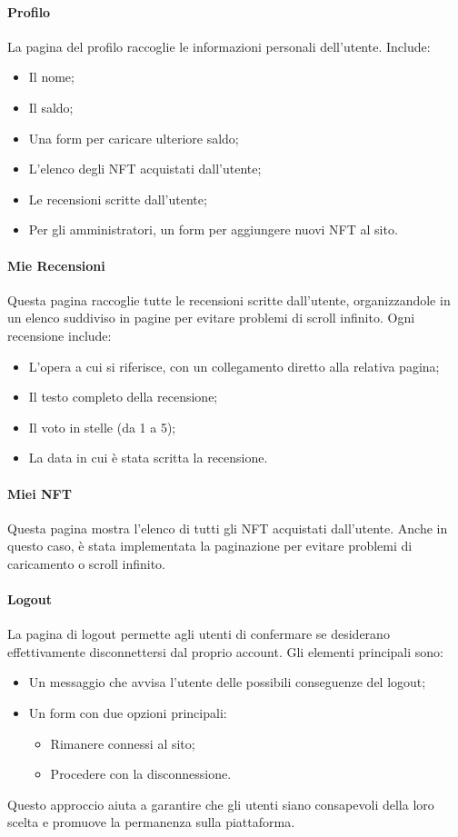 \documentclass[10pt]{article}
\begin{document}
\paragraph{Profilo} La pagina del profilo raccoglie le informazioni personali dell’utente. Include:
\begin{itemize}
    \item Il nome;
    \item Il saldo;
    \item Una form per caricare ulteriore saldo;
    \item L’elenco degli NFT acquistati dall’utente;
    \item Le recensioni scritte dall’utente;
    \item Per gli amministratori, un form per aggiungere nuovi NFT al sito.
\end{itemize}

\paragraph{Mie Recensioni}
Questa pagina raccoglie tutte le recensioni scritte dall’utente, organizzandole in un elenco suddiviso in pagine per evitare problemi di scroll infinito. Ogni recensione include:
\begin{itemize}
    \item L’opera a cui si riferisce, con un collegamento diretto alla relativa pagina;
    \item Il testo completo della recensione;
    \item Il voto in stelle (da 1 a 5);
    \item La data in cui è stata scritta la recensione.
\end{itemize} 

\paragraph{Miei NFT}
Questa pagina mostra l’elenco di tutti gli NFT acquistati dall’utente. Anche in questo caso, è stata implementata la paginazione per evitare problemi di caricamento o scroll infinito.

\paragraph{Logout} La pagina di logout permette agli utenti di confermare se desiderano effettivamente disconnettersi dal proprio account. Gli elementi principali sono:
\begin{itemize}
\item Un messaggio che avvisa l’utente delle possibili conseguenze del logout;
\item Un form con due opzioni principali:
\begin{itemize}
\item Rimanere connessi al sito;
\item Procedere con la disconnessione.
\end{itemize} 
\end{itemize} 
Questo approccio aiuta a garantire che gli utenti siano consapevoli della loro scelta e promuove la permanenza sulla piattaforma.
\end{document}
